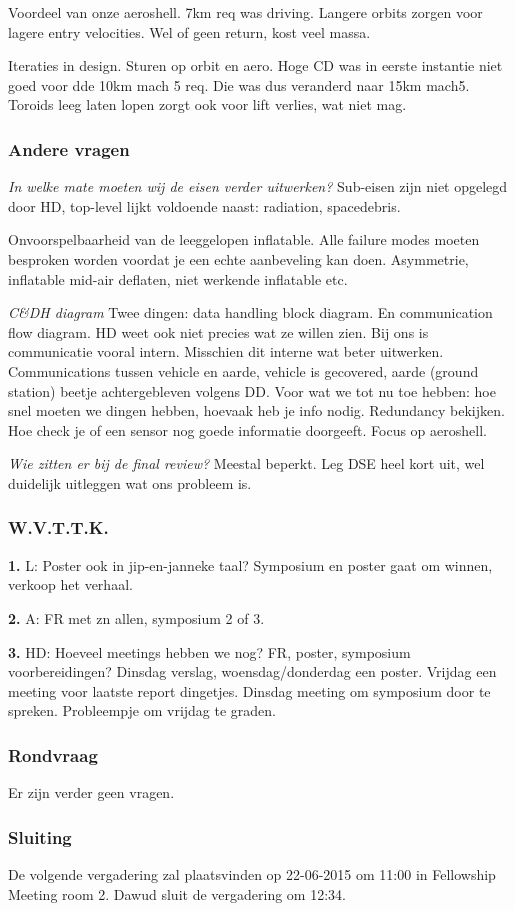 Voordeel van onze aeroshell. 7km req was driving. Langere orbits zorgen voor lagere entry velocities. Wel of geen return, kost veel massa.

Iteraties in design. Sturen op orbit en aero. Hoge CD was in eerste instantie niet goed voor dde 10km mach 5 req. Die was dus veranderd naar 15km mach5. Toroids leeg laten lopen zorgt ook voor lift verlies, wat niet mag. 

\subsubsection{Andere vragen}
\textit{In welke mate moeten wij de eisen verder uitwerken?} Sub-eisen zijn niet opgelegd door HD, top-level lijkt voldoende naast: radiation, spacedebris.

Onvoorspelbaarheid van de leeggelopen inflatable. Alle failure modes moeten besproken worden voordat je een echte aanbeveling kan doen. Asymmetrie, inflatable mid-air deflaten, niet werkende inflatable etc.

\textit{C\&DH diagram} Twee dingen: data handling block diagram. En communication flow diagram. HD weet ook niet precies wat ze willen zien. Bij ons is communicatie vooral intern. Misschien dit interne wat beter uitwerken. Communications tussen vehicle en aarde, vehicle is gecovered, aarde (ground station) beetje achtergebleven volgens DD. Voor wat we tot nu toe hebben: hoe snel moeten we dingen hebben, hoevaak heb je info nodig. Redundancy bekijken. Hoe check je of een sensor nog goede informatie doorgeeft. Focus op aeroshell.

\textit{Wie zitten er bij de final review?} Meestal beperkt. Leg DSE heel kort uit, wel duidelijk uitleggen wat ons probleem is.

\subsubsection{W.V.T.T.K.}
\textbf{1.} L: Poster ook in jip-en-janneke taal? Symposium en poster gaat om winnen, verkoop het verhaal.

\textbf{2.} A: FR met zn allen, symposium 2 of 3. 

\textbf{3.} HD: Hoeveel meetings hebben we nog? FR, poster, symposium voorbereidingen? Dinsdag verslag, woensdag/donderdag een poster. Vrijdag een meeting voor laatste report dingetjes. Dinsdag meeting om symposium door te spreken. Probleempje om vrijdag te graden. 

\subsubsection{Rondvraag}
Er zijn verder geen vragen.

\subsubsection{Sluiting}
De volgende vergadering zal plaatsvinden op 22-06-2015 om 11:00 in Fellowship Meeting room 2.
\newline\newline
Dawud sluit de vergadering om 12:34.